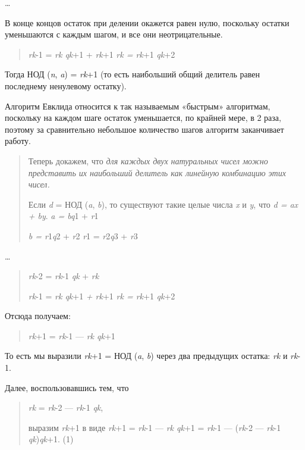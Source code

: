 \documentclass[12pt]{article}
\begin{document}
    \ldots{}

    В конце концов остаток при делении окажется равен нулю, поскольку
    остатки уменьшаются с каждым шагом, и все они неотрицательные.

    \begin{quote}
        \emph{rk}-1 = \emph{rk qk}+1 + \emph{rk}+1 \emph{rk = rk}+1 \emph{qk}+2
    \end{quote}

    Тогда НОД (\emph{n}, \emph{a}) = \emph{rk}+1 (то есть наибольший общий
    делитель равен последнему ненулевому остатку).

    Алгоритм Евклида относится к так называемым «быстрым» алгоритмам,
    поскольку на каждом шаге остаток уменьшается, по крайней мере, в 2 раза,
    поэтому за сравнительно небольшое количество шагов алгоритм заканчивает
    работу.

    \begin{quote}
        Теперь докажем, что \emph{для каждых двух натуральных чисел можно
            представить их наибольший делитель как линейную комбинацию этих чисел.}

        Если \emph{d} = НОД (\emph{a}, \emph{b}), то существуют такие целые
        числа \emph{x} и \emph{y}, что \emph{d = ax + by}. \emph{a = bq}1 +
        \emph{r}1

        \emph{b = r}1\emph{q}2 + \emph{r}2 \emph{r}1 = \emph{r}2\emph{q}3 +
        \emph{r}3
    \end{quote}

    \ldots{}

    \begin{quote}
        \emph{rk}-2 = \emph{rk}-1 \emph{qk} + \emph{rk}

        \emph{rk}-1 = \emph{rk qk}+1 \emph{+ rk}+1 \emph{rk = rk}+1 \emph{qk}+2
    \end{quote}

    Отсюда получаем:

    \begin{quote}
        \emph{rk}+1 = \emph{rk}-1 --- \emph{rk qk}+1
    \end{quote}

    То есть мы выразили \emph{rk}+1 = НОД (\emph{a}, \emph{b}) через два
    предыдущих остатка: \emph{rk} и \emph{rk}-1.

    Далее, воспользовавшись тем, что

    \begin{quote}
        \emph{rk} = \emph{rk}-2 --- \emph{rk}-1 \emph{qk},

        выразим \emph{rk}+1 в виде \emph{rk}+1 = \emph{rk}-1 --- \emph{rk qk}+1 =
        \emph{rk}-1 --- (\emph{rk}-2 --- \emph{rk}-1 \emph{qk})\emph{qk}+1. (1)
    \end{quote}
\end{document}

